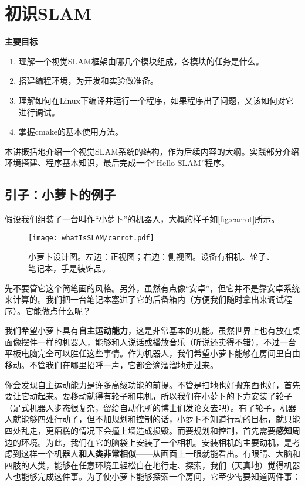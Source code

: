 
\chapter{初识SLAM}
\label{cpt:2}
\begin{mdframed}
	\textbf{主要目标}
	\begin{enumerate}[labelindent=0em,leftmargin=1.5em]
		\item 理解一个视觉SLAM框架由哪几个模块组成，各模块的任务是什么。
		\item 搭建编程环境，为开发和实验做准备。
		\item 理解如何在Linux下编译并运行一个程序，如果程序出了问题，又该如何对它进行调试。
		\item 掌握cmake的基本使用方法。
	\end{enumerate}
\end{mdframed}

本讲概括地介绍一个视觉SLAM系统的结构，作为后续内容的大纲。实践部分介绍环境搭建、程序基本知识，最后完成一个“Hello SLAM”程序。
\newpage

\newpage

\section{引子：小萝卜的例子}
假设我们组装了一台叫作“小萝卜”的机器人，大概的样子如\autoref{fig:carrot}所示。%

\begin{figure}[!ht]
	\centering
	\texttt{[image: whatIsSLAM/carrot.pdf]}
	\caption{小萝卜设计图。左边：正视图；右边：侧视图。设备有相机、轮子、笔记本，手是装饰品。}
	\label{fig:carrot}
\end{figure}

先不要管它这个简笔画的风格。另外，虽然有点像“安卓”，但它并不是靠安卓系统来计算的。我们把一台笔记本塞进了它的后备箱内（方便我们随时拿出来调试程序）。它能做点什么呢？

我们希望小萝卜具有\textbf{自主运动能力}，这是非常基本的功能。虽然世界上也有放在桌面像摆件一样的机器人，能够和人说话或播放音乐（听说还卖得不错），不过一台平板电脑完全可以胜任这些事情。作为机器人，我们希望小萝卜能够在房间里自由移动。不管我们在哪里招呼一声，它都会滴溜溜地走过来。

你会发现自主运动能力是许多高级功能的前提。不管是扫地也好搬东西也好，首先要让它动起来。要移动就得有轮子和电机，所以我们在小萝卜的下方安装了轮子（足式机器人步态很复杂，留给自动化所的博士们发论文去吧）。有了轮子，机器人就能够四处行动了，但不加规划和控制的话，小萝卜不知道行动的目标，就只能四处乱走，更糟糕的情况下会撞上墙造成损毁。而要规划和控制，首先需要\textbf{感知}周边的环境。为此，我们在它的脑袋上安装了一个相机。安装相机的主要动机，是考虑到这样一个机器人\textbf{和人类非常相似}——从画面上一眼就能看出。有眼睛、大脑和四肢的人类，能够在任意环境里轻松自在地行走、探索，我们（天真地）觉得机器人也能够完成这件事。为了使小萝卜能够探索一个房间，它至少需要知道两件事：

